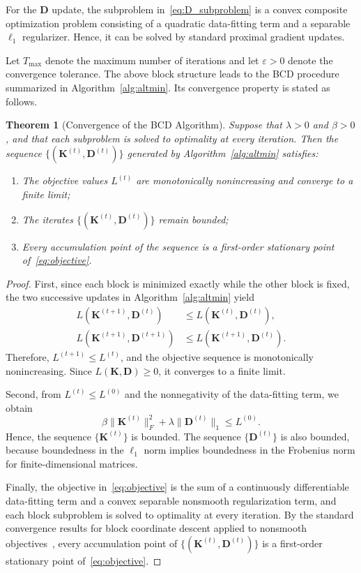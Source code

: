 \documentclass[final,3p,twocolumn,times]{elsarticle}
\newtheorem{theorem}{Theorem}[section]
\newcommand{\Kmat}{\mathbf{K}}
\newcommand{\Dmat}{\mathbf{D}}
\begin{document}
For the $\Dmat$ update, the subproblem in~\eqref{eq:D_subproblem} is a convex composite optimization problem consisting of a quadratic data-fitting term and a separable $\ell_1$ regularizer. Hence, it can be solved by standard proximal gradient updates.

Let $T_{\max}$ denote the maximum number of iterations and let $\varepsilon>0$ denote the convergence tolerance. The above block structure leads to the BCD procedure summarized in Algorithm~\ref{alg:altmin}. Its convergence property is stated as follows.

\begin{theorem}[Convergence of the BCD Algorithm]
\label{thm:altmin_convergence}
Suppose that $\lambda>0$ and $\beta>0$, and that each subproblem is solved to optimality at every iteration. Then the sequence $\{(\Kmat^{(t)}, \Dmat^{(t)})\}$ generated by Algorithm~\ref{alg:altmin} satisfies:
\begin{enumerate}
\item The objective values $L^{(t)}$ are monotonically nonincreasing and converge to a finite limit;
\item The iterates $\{(\Kmat^{(t)},\Dmat^{(t)})\}$ remain bounded;
\item Every accumulation point of the sequence is a first-order stationary point of~\eqref{eq:objective}.
\end{enumerate}
\end{theorem}

\begin{proof}
First, since each block is minimized exactly while the other block is fixed, the two successive updates in Algorithm~\ref{alg:altmin} yield
\[
\begin{aligned}
L(\Kmat^{(t+1)},\Dmat^{(t)}) &\le L(\Kmat^{(t)},\Dmat^{(t)}), \\
L(\Kmat^{(t+1)},\Dmat^{(t+1)}) &\le L(\Kmat^{(t+1)},\Dmat^{(t)}).
\end{aligned}
\]
Therefore, $L^{(t+1)} \le L^{(t)}$, and the objective sequence is monotonically nonincreasing. Since $L(\Kmat,\Dmat) \ge 0$, it converges to a finite limit.

Second, from $L^{(t)} \le L^{(0)}$ and the nonnegativity of the data-fitting term, we obtain
\[
\beta\|\Kmat^{(t)}\|_F^2 + \lambda\|\Dmat^{(t)}\|_1 \le L^{(0)}.
\]
Hence, the sequence $\{\Kmat^{(t)}\}$ is bounded. The sequence $\{\Dmat^{(t)}\}$ is also bounded, because boundedness in the $\ell_1$ norm implies boundedness in the Frobenius norm for finite-dimensional matrices.

Finally, the objective in~\eqref{eq:objective} is the sum of a continuously differentiable data-fitting term and a convex separable nonsmooth regularization term, and each block subproblem is solved to optimality at every iteration. By the standard convergence results for block coordinate descent applied to nonsmooth objectives~\cite{Tseng2001}, every accumulation point of $\{(\Kmat^{(t)},\Dmat^{(t)})\}$ is a first-order stationary point of~\eqref{eq:objective}.
\end{proof}
\end{document}
